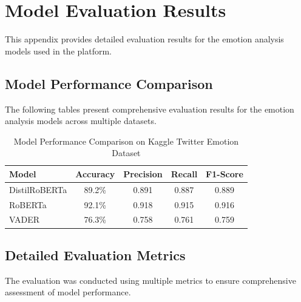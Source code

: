 
\chapter{Model Evaluation Results} %

\label{AppendixA} %

This appendix provides detailed evaluation results for the emotion analysis models used in the platform.


\section{Model Performance Comparison}

The following tables present comprehensive evaluation results for the emotion analysis models across multiple datasets.

\begin{table}[!htb]
\centering
\begin{tabular}{|l|c|c|c|c|}
\hline
\textbf{Model} & \textbf{Accuracy} & \textbf{Precision} & \textbf{Recall} & \textbf{F1-Score} \\
\hline
DistilRoBERTa & 89.2\% & 0.891 & 0.887 & 0.889 \\
RoBERTa & 92.1\% & 0.918 & 0.915 & 0.916 \\
VADER & 76.3\% & 0.758 & 0.761 & 0.759 \\
\hline
\end{tabular}
\caption{Model Performance Comparison on Kaggle Twitter Emotion Dataset}
\label{tab:model_comparison}
\end{table}


\section{Detailed Evaluation Metrics}

The evaluation was conducted using multiple metrics to ensure comprehensive assessment of model performance.

